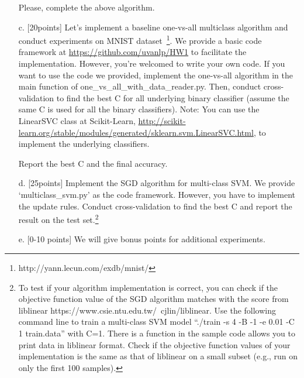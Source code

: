 \begin{enumerate}
\begin{algorithmic}
\ENDFOR
 \STATE
    \STATE

\ENDIF
\ENDFOR
\ENDFOR
\end{algorithmic}
Please, complete the above algorithm.

\item[c.] {[20points]} Let's implement a baseline one-vs-all  multiclass algorithm and conduct experiments on MNIST dataset~\footnote{http://yann.lecun.com/exdb/mnist/}.  We provide a basic code framework at \url{https://github.com/uvanlp/HW1} to facilitate the implementation. However, you're welcomed to write your own code. If you want to use the code we provided, implement the one-vs-all algorithm in the main function of one\_vs\_all\_with\_data\_reader.py. Then, conduct cross-validation to find the best C for all underlying binary classifier (assume the same C is used for all the binary classifiers). Note: You can use the LinearSVC class at Scikit-Learn,  \url{http://scikit-learn.org/stable/modules/generated/sklearn.svm.LinearSVC.html}, to implement the underlying classifiers.

Report the best C and the final accuracy.

\item[d.] {[25points]} Implement the SGD algorithm for multi-class SVM. We provide `multiclass\_svm.py' as the code framework. However, you have to implement the update rules. Conduct cross-validation to find the best C and report the result on the test set.\footnote{ To test if your algorithm implementation is correct, you can check if the objective function value of the SGD algorithm matches with the score from liblinear  https://www.csie.ntu.edu.tw/~cjlin/liblinear. Use the following command line to train a multi-class SVM model
``./train  -s 4 -B -1 -e 0.01 -C 1 train.data'' with C=1.
There is a function in the sample code allows you to print data in liblinear format. Check if the objective function values of your implementation is the same as that of liblinear on a small subset  (e.g., run on only the first 100 samples).}
\item[e.] {[0-10 points]} We will give bonus points for additional  experiments.
\end{enumerate}


